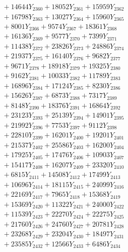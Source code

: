 \documentclass[a4paper,10pt]{article}
\begin{document}
{\begin{align}
&\;  + 14644 Y_{2360} + 18052 Y_{2361} + 15959 Y_{2362} \\[0.3ex]
&\;  + 16798 Y_{2363} + 13027 Y_{2364} + 15960 Y_{2365} \\[0.3ex]
&\;  + 8001 Y_{2366} + 9574 Y_{2367} + 18361 Y_{2368} \\[0.5ex]\allowbreak
&\;  + 16136 Y_{2369} + 9577 Y_{2370} + 7399 Y_{2371} \\[0.3ex]
&\;  + 11438 Y_{2372} + 23826 Y_{2373} + 24886 Y_{2374} \\[0.3ex]
&\;  + 21937 Y_{2375} + 16140 Y_{2376} + 9682 Y_{2377} \\[0.3ex]
&\;  + 9671 Y_{2378} + 18918 Y_{2379} + 19325 Y_{2380} \\[0.3ex]
&\;  + 9162 Y_{2381} + 10033 Y_{2382} + 11789 Y_{2383} \\[0.3ex]
&\;  + 16896 Y_{2384} + 17124 Y_{2385} + 8230 Y_{2386} \\[0.3ex]
&\;  + 15626 Y_{2387} + 6873 Y_{2388} + 7317 Y_{2389} \\[0.3ex]
&\;  + 8148 Y_{2390} + 18376 Y_{2391} + 16864 Y_{2392} \\[0.3ex]
&\;  + 23123 Y_{2393} + 25139 Y_{2394} + 14901 Y_{2395} \\[0.3ex]
&\;  + 21992 Y_{2396} + 7753 Y_{2397} + 9112 Y_{2398} \\[0.5ex]\allowbreak
&\;  + 22810 Y_{2399} + 16201 Y_{2400} + 19201 Y_{2401} \\[0.3ex]
&\;  + 21537 Y_{2402} + 25586 Y_{2403} + 16200 Y_{2404} \\[0.3ex]
&\;  + 17925 Y_{2405} + 17476 Y_{2406} + 10903 Y_{2407} \\[0.3ex]
&\;  + 15417 Y_{2408} + 16207 Y_{2409} + 23320 Y_{2410} \\[0.3ex]
&\;  + 6815 Y_{2411} + 14508 Y_{2412} + 17499 Y_{2413} \\[0.3ex]
&\;  + 10696 Y_{2414} + 18115 Y_{2415} + 24099 Y_{2416} \\[0.3ex]
&\;  + 22169 Y_{2417} + 7965 Y_{2418} + 15368 Y_{2419} \\[0.3ex]
&\;  + 15369 Y_{2420} + 11322 Y_{2421} + 24000 Y_{2422} \\[0.3ex]
&\;  + 11539 Y_{2423} + 22270 Y_{2424} + 22275 Y_{2425} \\[0.3ex]
&\;  + 21760 Y_{2426} + 24760 Y_{2427} + 20781 Y_{2428} \\[0.5ex]\allowbreak
&\;  + 23268 Y_{2429} + 23204 Y_{2430} + 18497 Y_{2431} \\[0.3ex]
&\;  + 23585 Y_{2432} + 12566 Y_{2433} + 6486 Y_{2434} \\[0.3ex]

\end{align}}
\end{document}
